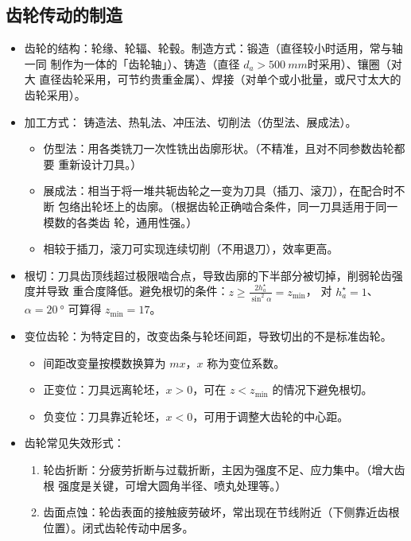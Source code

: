 \documentclass[12pt,a4paper]{article}
\newcommand{\tightlist}{\setlength{\parskip}{0pt}\setlength{\itemsep}{0pt}}
\newcommand{\hint}[1]{\textsf{（#1）}}
\newcommand{\minor}[1]{{\color{gray} #1}}
\begin{document}
\subsection{齿轮传动的制造}
\begin{itemize}\tightlist
    \item 齿轮的结构：轮缘、轮辐、轮毂。制造方式：锻造\hint{直径较小时适用，常与轴一同
    制作为一体的「齿轮轴」}、铸造\hint{直径 $d_a>\SI{500}{mm}$时采用}、镶圈\hint{对大
    直径齿轮采用，可节约贵重金属}、焊接\hint{对单个或小批量，或尺寸太大的齿轮采用}。
    \item 加工方式：\minor{铸造法、热轧法、冲压法、}切削法\hint{仿型法、展成法}。
    \begin{itemize}\tightlist
        \item 仿型法：用各类铣刀一次性铣出齿廓形状。\hint{不精准，且对不同参数齿轮都要
        重新设计刀具。}
        \item 展成法：相当于将一堆共轭齿轮之一变为刀具\hint{插刀、滚刀}，在配合时不断
        包络出轮坯上的齿廓。\hint{根据齿轮正确啮合条件，同一刀具适用于同一模数的各类齿
        轮，通用性强。}
        \item 相较于插刀，滚刀可实现连续切削\hint{不用退刀}，效率更高。
    \end{itemize}
    \item 根切：刀具齿顶线超过极限啮合点，导致齿廓的下半部分被切掉，削弱轮齿强度并导致
    重合度降低。避免根切的条件：$z\geq\frac{2h_a^\star}{\sin^2\alpha}=z_\text{min}$，
    对 $h_a^\star=1$、$\alpha=\SI{20}\degree$ 可算得 $z_\text{min}=17$。
    \item 变位齿轮：为特定目的，改变齿条与轮坯间距，导致切出的不是标准齿轮。
    \begin{itemize}\tightlist
        \item 间距改变量按模数换算为 $mx$，$x$ 称为变位系数。
        \item 正变位：刀具远离轮坯，$x>0$，可在 $z<z_\text{min}$ 的情况下避免根切。
        \item 负变位：刀具靠近轮坯，$x<0$，可用于调整大齿轮的中心距。
    \end{itemize}
    \item 齿轮常见失效形式：
    \begin{enumerate}\tightlist
        \item 轮齿折断：分疲劳折断与过载折断，主因为强度不足、应力集中。\hint{增大齿根
        强度是关键，可增大圆角半径、喷丸处理等。}
        \item 齿面点蚀：轮齿表面的接触疲劳破坏，常出现在节线附近\hint{下侧靠近齿根位置}。闭式齿轮传动中居多。

\end{enumerate}
\end{itemize}
\end{document}
